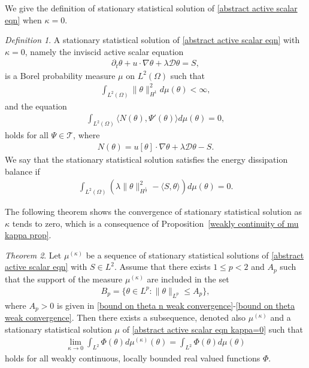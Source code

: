 \documentclass[reqno]{amsart}%
\theoremstyle{definition}
\theoremstyle{remark}
\numberwithin{equation}{section}
\newtheorem{theorem}{Theorem}
\newtheorem{definition}[theorem]{Definition}
\newcommand{\1}{\mathbf{1}}
\numberwithin{equation}{section}
\numberwithin{theorem}{section}
\numberwithin{figure}{section}
\begin{document}
We give the definition of stationary statistical solution of \eqref{abstract active scalar eqn} when $\kappa=0$.
\begin{definition}
A stationary statistical solution of \eqref{abstract active scalar eqn} with $\kappa=0$, namely the inviscid active scalar equation 
\begin{align}\label{abstract active scalar eqn kappa=0}
\partial_t\theta+u\cdot\nabla\theta+\lambda\mathcal{D}\theta=S,
\end{align}
is a Borel probability measure $\mu$ on $L^2(\Omega)$ such that
\begin{align}\label{boundedness on mu on L2}
\int_{L^2(\Omega)}\|\theta\|_{H^1}^2d\mu(\theta)<\infty,
\end{align}
and the equation 
\begin{align}\label{integral identity on mu on L2}
\int_{L^2(\Omega)}\langle N(\theta),\Psi'(\theta)\rangle d\mu(\theta)=0,
\end{align}
holds for all $\Psi\in\mathcal{T}$, where
\begin{align*}
N(\theta)=u[\theta]\cdot\nabla\theta+\lambda\mathcal{D}\theta-S.
\end{align*}
We say that the stationary statistical solution satisfies the energy dissipation balance if
\begin{align}\label{energy dissipation balance}
\int_{L^2(\Omega)}(\lambda\|\theta\|_{H^\frac{1}{2}}^2-\langle S,\theta\rangle)d\mu(\theta)=0.
\end{align}
\end{definition}
The following theorem shows the convergence of stationary statistical solution as $\kappa$ tends to zero, which is a consequence of Proposition~\ref{weakly continuity of mu kappa prop}.
\begin{theorem}
Let $\mu^{(\kappa)}$ be a sequence of stationary statistical solutions of \eqref{abstract active scalar eqn} with $S\in L^2$. Assume that there exists $1\le p<2$ and $A_p$ such that the support of the measure $\mu^{(\kappa)}$ are included in the set
\begin{align}\label{set Bp}
B_{p}=\{\theta\in L^p:\|\theta\|_{L^p}\le A_p\},
\end{align}
where $A_p>0$ is given in \eqref{bound on theta n weak convergence}-\eqref{bound on theta weak convergence}. Then there exists a subsequence, denoted also $\mu^{(\kappa)}$ and a stationary statistical
solution $\mu$ of \eqref{abstract active scalar eqn kappa=0} such that
\begin{align}\label{weak limit integral identity for mu}
\lim_{\kappa\to0}\int_{L^2}\Phi(\theta)d\mu^{(\kappa)}(\theta)=\int_{L^2}\Phi(\theta)d\mu(\theta)
\end{align}
holds for all weakly continuous, locally bounded real valued functions $\Phi$.
\end{theorem}
\end{document}
